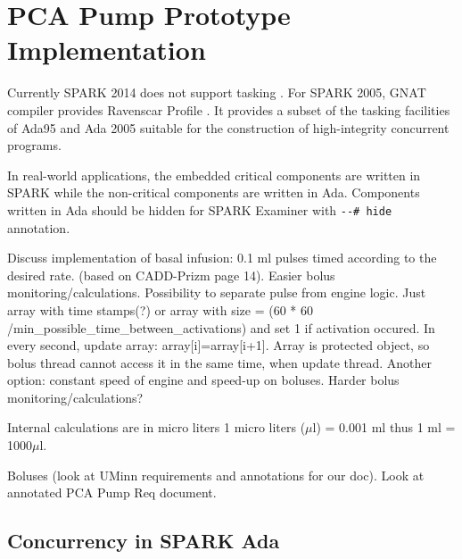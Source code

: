 
\cleardoublepage


\chapter{PCA Pump Prototype Implementation}
\label{pcapumpimpl}

Currently SPARK 2014 does not support tasking \cite{Spark2014refManual:Online}. For SPARK 2005, GNAT compiler provides Ravenscar Profile \cite{Ravenscar:Online}. It provides a subset of the tasking facilities of Ada95 and Ada 2005 suitable for the construction of high-integrity concurrent programs.

In real-world applications, the embedded critical components are written in SPARK while the non-critical components are written in Ada. Components written in Ada should be hidden for SPARK Examiner with \lstinline{--# hide} annotation.

Discuss implementation of basal infusion: 0.1 ml pulses timed according to the desired rate. (based on CADD-Prizm page 14). Easier bolus monitoring/calculations. Possibility to separate pulse from engine logic. Just array with time stamps(?) or array with size = (60 * 60 /min\_possible\_time\_between\_activations) and set 1 if activation occured. In every second, update array: array[i]=array[i+1]. Array is protected object, so bolus thread cannot access it in the same time, when update thread.
Another option: constant speed of engine and speed-up on boluses. Harder bolus monitoring/calculations?

Internal calculations are in micro liters 1 micro liters ($\mu$l) = 0.001 ml thus 1 ml = 1000$\mu$l.

Boluses (look at UMinn requirements and annotations for our doc).
Look at annotated PCA Pump Req document.

\section{Concurrency in SPARK Ada}
\label{pcapump:implementation:concurrency}

